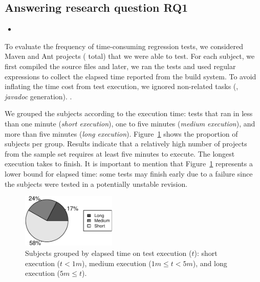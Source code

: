 \subsection{Answering research question RQ1}
\label{sec:rqone}

\begin{itemize}
    \item \RQA
\end{itemize}

To evaluate the frequency of time-consuming regression tests, we
considered  Maven and  Ant projects ( total)
that we were able to test. For each subject, we first compiled the
source files and later, we ran the tests and used regular expressions
to collect the elapsed time reported from the build system. To avoid
inflating the time cost from test execution, we ignored non-related
tasks (\eg, \emph{javadoc} generation). .

We grouped the subjects according to the execution time: tests that
ran in less than one minute (\emph{short execution}), one to five
minutes (\emph{medium execution}), and more than five minutes
(\emph{long execution}).  Figure~\ref{fig:piechart-time} shows the
proportion of subjects per group.  Results indicate that a relatively
high number of projects from the sample set requires at least five
minutes to execute. The longest execution takes  to finish. It
is important to mention that Figure~\ref{fig:piechart-time} represents
a lower bound for elapsed time: some tests may finish early due to a
failure since the subjects were tested in a potentially unstable
revision.

\begin{figure}[h!]
    \centering
    \includegraphics[width=0.4\textwidth]{results/rq1/plots/piechart.pdf}
    \caption{\label{fig:piechart-time} Subjects grouped by elapsed
    time on test execution ($t$): short execution ($t < 1m$), medium 
    execution ($1m \leq t < 5m$), and long execution ($5m \leq t$).}
\end{figure}

